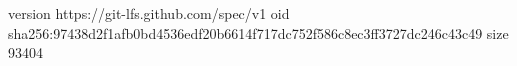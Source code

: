version https://git-lfs.github.com/spec/v1
oid sha256:97438d2f1afb0bd4536edf20b6614f717dc752f586c8ec3ff3727dc246c43c49
size 93404

